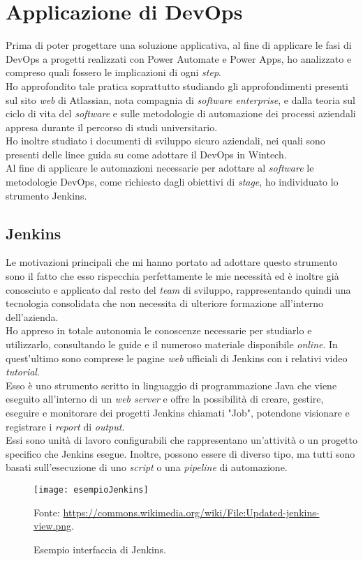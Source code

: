 \section{Applicazione di DevOps}%
Prima di poter progettare una soluzione applicativa, al fine di applicare le fasi di \gls{DevOps} a progetti realizzati con Power Automate e Power Apps, ho analizzato e compreso quali fossero le implicazioni di ogni \emph{step}.\\
Ho approfondito tale pratica soprattutto studiando gli approfondimenti presenti sul sito \emph{web} di Atlassian, nota compagnia di \emph{software enterprise}, e dalla teoria sul ciclo di vita del \emph{software} e sulle metodologie di automazione dei processi aziendali appresa durante il percorso di studi universitario.\\
Ho inoltre studiato i documenti di sviluppo sicuro aziendali, nei quali sono presenti delle linee guida su come adottare il \gls{DevOps} in Wintech.\\
Al fine di applicare le automazioni necessarie per adottare al \emph{software} le metodologie \gls{DevOps}, come richiesto dagli obiettivi di \emph{stage}, ho individuato lo strumento Jenkins.\\

\subsection{Jenkins}
Le motivazioni principali che mi hanno portato ad adottare questo strumento sono il fatto che esso rispecchia perfettamente le mie necessità ed è inoltre già conosciuto e applicato dal resto del \emph{team} di sviluppo, rappresentando quindi una tecnologia consolidata che non necessita di ulteriore formazione all'interno dell'azienda.\\
Ho appreso in totale autonomia le conoscenze necessarie per studiarlo e utilizzarlo, consultando le guide e il numeroso materiale disponibile \emph{online}. In quest'ultimo sono comprese le pagine \emph{web} ufficiali di Jenkins con i relativi video \emph{tutorial}.\\
Esso è uno strumento scritto in linguaggio di programmazione Java che viene eseguito all'interno di un \emph{web server} e offre la possibilità di creare, gestire, eseguire e monitorare dei progetti Jenkins chiamati "Job", potendone visionare e registrare i \emph{report} di \emph{output}.\\
Essi sono unità di lavoro configurabili che rappresentano un'attività o un progetto specifico che Jenkins esegue. Inoltre, possono essere di diverso tipo, ma tutti sono basati sull'esecuzione di uno \emph{script} o una \emph{pipeline} di automazione.
\begin{figure}[htbp] 
    \centering 
    \texttt{[image: esempioJenkins]} 
    \caption{Esempio interfaccia di Jenkins.}
    \label{fig:esempioJenkins}
    \vspace{1mm}
    Fonte: \url{https://commons.wikimedia.org/wiki/File:Updated-jenkins-view.png}.
\end{figure}


